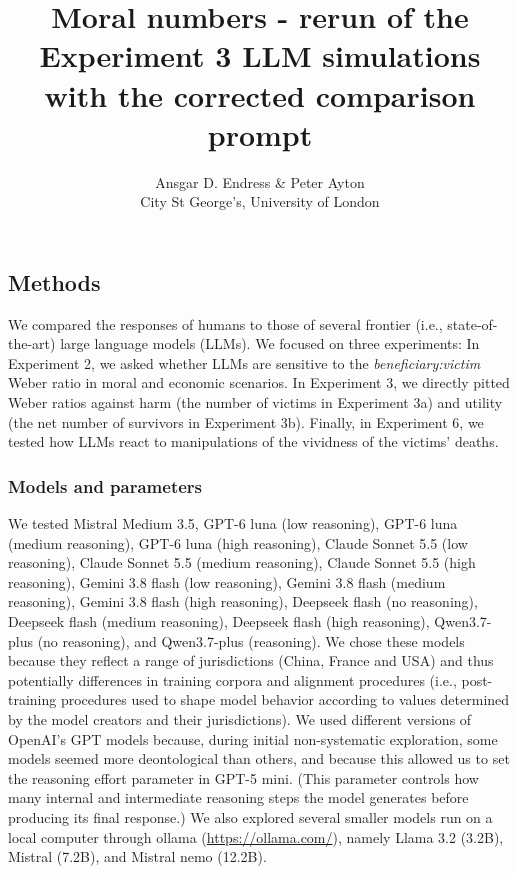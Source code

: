 \documentclass[
]{article}
\title{Moral numbers - rerun of the Experiment 3 LLM simulations with the corrected comparison prompt}
\author{Ansgar D. Endress \& Peter Ayton\\
City St George's, University of London}
\date{}
\begin{document}
\maketitle

\subsection{Methods}\label{methods}

We compared the responses of humans to those of several frontier (i.e., state-of-the-art) large language models (LLMs). We focused on three experiments: In Experiment 2, we asked whether LLMs are sensitive to the \emph{beneficiary:victim} Weber ratio in moral and economic scenarios. In Experiment 3, we directly pitted Weber ratios against harm (the number of victims in Experiment 3a) and utility (the net number of survivors in Experiment 3b). Finally, in Experiment 6, we tested how LLMs react to manipulations of the vividness of the victims' deaths.

\subsubsection{Models and parameters}\label{models-and-parameters}

We tested Mistral Medium 3.5, GPT-6 luna (low reasoning), GPT-6 luna (medium reasoning), GPT-6 luna (high reasoning), Claude Sonnet 5.5 (low reasoning), Claude Sonnet 5.5 (medium reasoning), Claude Sonnet 5.5 (high reasoning), Gemini 3.8 flash (low reasoning), Gemini 3.8 flash (medium reasoning), Gemini 3.8 flash (high reasoning), Deepseek flash (no reasoning), Deepseek flash (medium reasoning), Deepseek flash (high reasoning), Qwen3.7-plus (no reasoning), and Qwen3.7-plus (reasoning). We chose these models because they reflect a range of jurisdictions (China, France and USA) and thus potentially differences in training corpora and alignment procedures (i.e., post-training procedures used to shape model behavior according to values determined by the model creators and their jurisdictions). We used different versions of OpenAI's GPT models because, during initial non-systematic exploration, some models seemed more deontological than others, and because this allowed us to set the reasoning effort parameter in GPT-5 mini. (This parameter controls how many internal and intermediate reasoning steps the model generates before producing its final response.) We also explored several smaller models run on a local computer through ollama (\url{https://ollama.com/}), namely Llama 3.2 (3.2B), Mistral (7.2B), and Mistral nemo (12.2B).
\end{document}
